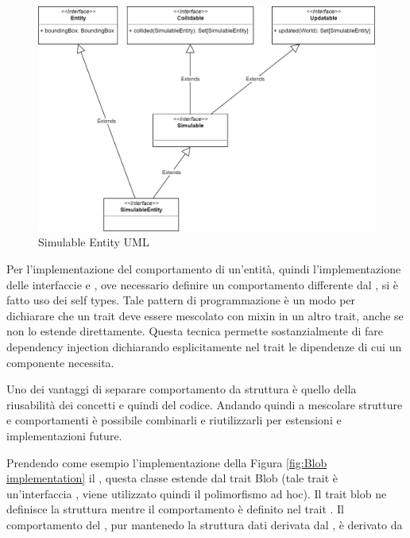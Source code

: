 \begin{figure}[h!]
\centering
\includegraphics[width=\textwidth, scale=0.44]{img/SimulableEntity.png}
\caption{Simulable Entity UML}
\label{fig:simentity}
\end{figure}

Per l'implementazione del comportamento di un'entità, quindi l'implementazione delle interfaccie  e , ove necessario definire un comportamento differente dal , si è fatto uso dei self types. Tale pattern di programmazione è un modo per dichiarare che un trait deve essere mescolato con mixin in un altro trait, anche se non lo estende direttamente. Questa tecnica permette sostanzialmente di fare dependency injection dichiarando esplicitamente nel trait le dipendenze di cui un componente necessita.

Uno dei vantaggi di separare comportamento da struttura è quello della riusabilità dei concetti e quindi del codice. Andando quindi a mescolare strutture e comportamenti è possibile combinarli e riutilizzarli per estensioni  e implementazioni future. 

Prendendo come esempio l'implementazione della Figura \ref{fig:Blob implementation} il , questa classe estende dal trait Blob (tale trait è un'interfaccia , viene utilizzato quindi il polimorfismo ad hoc). Il trait blob ne definisce la struttura mentre il comportamento è definito nel trait . Il comportamento del , pur mantenedo la struttura dati derivata dal , è derivato da 

